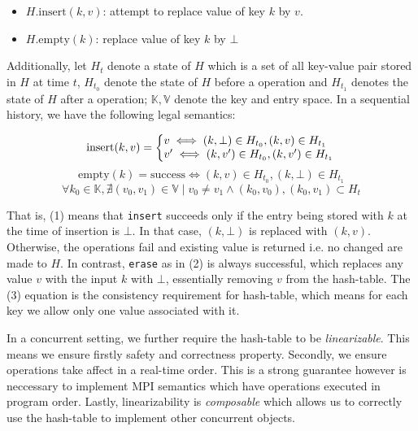 \begin{itemize}
  \item $H.\text{insert}(k,v)$: attempt to replace value of key $k$ by $v$.
  \item $H.\text{empty}(k)$: replace value of key $k$ by $\bot$
\end{itemize}

Additionally, let $H_t$ denote a state of $H$ which is a set of all key-value
pair stored in $H$ at time $t$, $H_{t_0}$ denote the state of $H$ before a
operation and $H_{t_1}$ denotes the state of $H$ after a operation;
$\mathbb{K}, \mathbb{V}$ denote the key and entry space. In a sequential
history, we have the following legal semantics:

\begin{equation}
  \text{insert}(k, v) = \left\{
    \begin{array}{@{}l@{\thinspace}l}
      v \iff (k,\bot) \in H_{t_0}, (k,v) \in H_{t_1}\\
      v' \iff (k,v') \in H_{t_0}, (k,v') \in H_{t_1}
    \end{array}
    \right.
\end{equation}
\begin{equation}
  \text{empty}(k) = \text{success} \iff  (k,v) \in H_{t_0}, (k,\bot) \in H_{t_1}
\end{equation}
\begin{equation}
  \forall k_0 \in \mathbb{K}, \nexists {(v_0, v_1) \in \mathbb{V}}
  \mid {{v_0 \ne v_1} \wedge {(k_0, v_0), (k_0, v_1)} \subset H_{t}}
\end{equation}

That is, (1) means that \texttt{insert} succeeds only if the entry being stored
with $k$ at the time of insertion is $\bot$.  In that case, $(k,\bot)$ is
replaced with $(k, v)$. Otherwise, the operations fail and existing value is
returned i.e. no changed are made to $H$. In contrast, \texttt{erase} as in (2)
is always successful, which replaces any value $v$ with the input $k$ with
$\bot$, essentially removing $v$ from the hash-table. The (3) equation is the
consistency requirement for hash-table, which means for each key we allow
only one value associated with it.

In a concurrent setting, we further require the hash-table to be
\textit{linearizable}.  This means we ensure firstly safety and correctness
property. Secondly, we ensure operations take affect in a real-time order.
This is a strong guarantee however is neccessary to implement MPI semantics
which have operations executed in program order. Lastly, linearizability is
\textit{composable} which allows us to correctly use the hash-table to
implement other concurrent objects.

